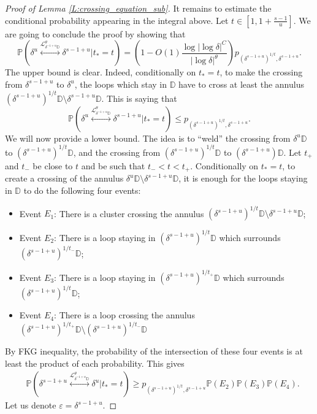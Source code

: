 \documentclass[10pt,a4paper]{amsart}
\newcommand{\D}{\mathbb{D}}
\newcommand{\Lc}{\mathcal{L}}
\newcommand{\Prob}[1]{\mathbb{P} \left( #1 \right) }
\newcommand{\eps}{\varepsilon}
\begin{document}
\begin{proof}[Proof of Lemma \ref{L:crossing_equation_sub}]
It remains to estimate the conditional probability appearing in the integral above.
Let $t \in [1, 1 + \frac{s-1}{u}]$.
We are going to conclude the proof by showing that
\begin{equation}
\label{E:proof_1234}
\Prob{ \delta^u \overset{\Lc_{\delta^{-1+u} \D}^\theta}{\longleftrightarrow} \delta^{s-1+u} \Big\vert t_* = t}
= \left( 1 - O(1) \frac{\log |\log \delta|^C}{|\log \delta|^\theta} \right) p_{(\delta^{s-1+u})^{1/t},\delta^{s-1+u}}.
\end{equation}
The upper bound is clear. Indeed,
conditionally on $t_* = t$, to make the crossing from $\delta^{s-1+u}$ to $\delta^u$, the loops which stay in $\D$ have to cross at least the annulus $(\delta^{s-1+u})^{1/t} \D \setminus \delta^{s-1+u} \D$. This is saying that
\[
\Prob{ \delta^u \overset{\Lc_{\delta^{-1+u} \D}^\theta}{\longleftrightarrow} \delta^{s-1+u} \Big\vert t_* = t}
\leq p_{(\delta^{s-1+u})^{1/t}, \delta^{s-1+u}}.
\]
We will now provide a lower bound. The idea is to ``weld'' the crossing from $\delta^u \D$ to $(\delta^{s-1+u})^{1/t} \D$, and the crossing from $(\delta^{s-1+u})^{1/t} \D$ to $(\delta^{s-1+u}) \D$. Let $t_+$ and $t_-$ be close to $t$ and be such that $t_- < t < t_+$.
Conditionally on $t_* = t$, to create a crossing of the annulus $\delta^u \D \setminus \delta^{s-1+u} \D$, it is enough for the loops staying in $\D$ to do the following four events:
\begin{itemize}
\item
Event $E_1$: There is a cluster crossing the annulus $(\delta^{s-1+u})^{1/t} \D \setminus \delta^{s-1+u} \D$;
\item
Event $E_2$: There is a loop staying in $(\delta^{s-1+u})^{1/t} \D$ which surrounds $(\delta^{s-1+u})^{1/t_-} \D$;
\item
Event $E_3$: There is a loop staying in $(\delta^{s-1+u})^{1/t_+} \D$ which surrounds $(\delta^{s-1+u})^{1/t} \D$;
\item
Event $E_4$: There is a loop crossing the annulus $(\delta^{s-1+u})^{1/t_+} \D \setminus (\delta^{s-1+u})^{1/t_-} \D$
\end{itemize}
By FKG inequality, the probability of the intersection of these four events is at least the product of each probability. This gives
\begin{align*}
& \Prob{ \delta^{s-1+u} \overset{\Lc_{\delta^{-1+u} \D}^\theta}{\longleftrightarrow} \delta^u \Big\vert t_* = t}
\geq p_{(\delta^{s-1+u})^{1/t},\delta^{s-1+u}} \Prob{E_2} \Prob{E_3} \Prob{E_4}.
\end{align*}
Let us denote $\eps = \delta^{s-1+u}$.

\end{proof}
\end{document}
